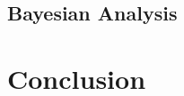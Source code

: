\subsection{Bayesian Analysis}
\label{sec:probability:bayesian_stats:bayesian_analysis}












\section{Conclusion}
\label{sec:probability:conclusion}



